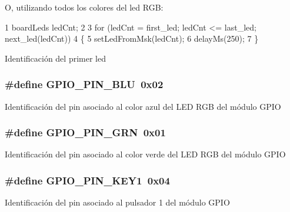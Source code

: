 O, utilizando todos los colores del led R\+GB\+:


\begin{DoxyCode}
1 boardLeds ledCnt;
2 
3 for (ledCnt = first\_led; ledCnt <= last\_led; next\_led(ledCnt))
4 \{
5   setLedFromMsk(ledCnt);
6   delayMs(250);
7 \}
\end{DoxyCode}
Identificación del primer led 
\subsubsection[{\texorpdfstring{G\+P\+I\+O\+\_\+\+P\+I\+N\+\_\+\+B\+LU}{GPIO_PIN_BLU}}]{\setlength{\rightskip}{0pt plus 5cm}\#define G\+P\+I\+O\+\_\+\+P\+I\+N\+\_\+\+B\+LU~0x02}\hypertarget{group__hardware_ga2aa9b3c113e9f52a2e04ff811b8ec518}{}\label{group__hardware_ga2aa9b3c113e9f52a2e04ff811b8ec518}
Identificación del pin asociado al color azul del L\+ED R\+GB del módulo G\+P\+IO 
\subsubsection[{\texorpdfstring{G\+P\+I\+O\+\_\+\+P\+I\+N\+\_\+\+G\+RN}{GPIO_PIN_GRN}}]{\setlength{\rightskip}{0pt plus 5cm}\#define G\+P\+I\+O\+\_\+\+P\+I\+N\+\_\+\+G\+RN~0x01}\hypertarget{group__hardware_ga8ce252c71154210c65808a2170d74223}{}\label{group__hardware_ga8ce252c71154210c65808a2170d74223}
Identificación del pin asociado al color verde del L\+ED R\+GB del módulo G\+P\+IO 
\subsubsection[{\texorpdfstring{G\+P\+I\+O\+\_\+\+P\+I\+N\+\_\+\+K\+E\+Y1}{GPIO_PIN_KEY1}}]{\setlength{\rightskip}{0pt plus 5cm}\#define G\+P\+I\+O\+\_\+\+P\+I\+N\+\_\+\+K\+E\+Y1~0x04}\hypertarget{group__hardware_ga26fa1a6916e027dcfa2d5a76c18dccb4}{}\label{group__hardware_ga26fa1a6916e027dcfa2d5a76c18dccb4}
Identificación del pin asociado al pulsador 1 del módulo G\+P\+IO 

